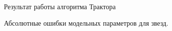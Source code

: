 \documentclass[12pt,a4paper]{article}
\begin{document}
\begin{figure}
\begin{minipage}{0.25\linewidth}
    \end{minipage}
    \hfill 
    \begin{minipage}{0.25\linewidth}
    \end{minipage}
    \caption{ Результат работы алгоритма Трактора} \label{pic3}
\end{figure}

\begin{figure}
    \caption{Абсолютные ошибки модельных параметров для звезд.} \label{pic4}
\end{figure}
\end{document}
